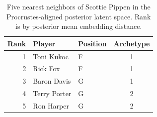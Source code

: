 \begin{table}[htbp]
  \centering\small
  \begin{tabular}{rllc}
    \toprule
    Rank & Player & Position & Archetype \\
    \midrule
    1 & Toni Kukoc & F & 1 \\
    2 & Rick Fox & F & 1 \\
    3 & Baron Davis & G & 1 \\
    4 & Terry Porter & G & 2 \\
    5 & Ron Harper & G & 2 \\
    \bottomrule
  \end{tabular}
  \caption{Five nearest neighbors of Scottie Pippen in the Procrustes-aligned posterior latent space. Rank is by posterior mean embedding distance.}
  \label{tab:Scottie_Pippen_neighbors}
\end{table}

